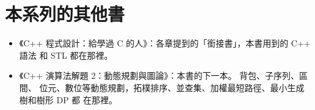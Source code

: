 \section*{本系列的其他書}

\begin{itemize}
\item 《C++ 程式設計：給學過 C 的人》：各章提到的「銜接書」，本書用到的 C++ 語法
和 STL 都在那裡。
\item 《C++ 演算法解題 2：動態規劃與圖論》：本書的下一本。 背包、子序列、區間、
位元、數位等動態規劃，拓樸排序、並查集、加權最短路徑、最小生成樹和樹形 DP 都
在那裡。
\end{itemize}
